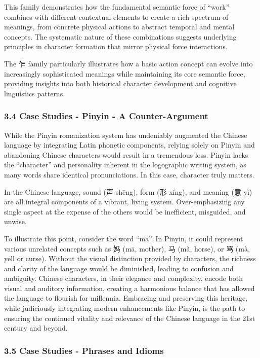 \documentclass[
  11pt,
  letterpaper,
]{article}
\begin{document}
This family demonstrates how the fundamental semantic force of ``work''
combines with different contextual elements to create a rich spectrum of
meanings, from concrete physical actions to abstract temporal and mental
concepts. The systematic nature of these combinations suggests
underlying principles in character formation that mirror physical force
interactions.

The 乍 family particularly illustrates how a basic action concept can
evolve into increasingly sophisticated meanings while maintaining its
core semantic force, providing insights into both historical character
development and cognitive linguistics patterns.

\subsubsection{3.4 Case Studies - Pinyin - A
Counter-Argument}\label{case-studies---pinyin---a-counter-argument}

While the Pinyin romanization system has undeniably augmented the
Chinese language by integrating Latin phonetic components, relying
solely on Pinyin and abandoning Chinese characters would result in a
tremendous loss. Pinyin lacks the ``character'' and personality inherent
in the logographic writing system, as many words share identical
pronunciations. In this case, character truly matters.

In the Chinese language, sound (声 shēng), form (形 xíng), and meaning
(意 yì) are all integral components of a vibrant, living system.
Over-emphasizing any single aspect at the expense of the others would be
inefficient, misguided, and unwise.

To illustrate this point, consider the word ``ma''. In Pinyin, it could
represent various unrelated concepts such as 妈 (mā, mother), 马 (mǎ,
horse), or 骂 (mà, yell or curse). Without the visual distinction
provided by characters, the richness and clarity of the language would
be diminished, leading to confusion and ambiguity. Chinese characters,
in their elegance and complexity, encode both visual and auditory
information, creating a harmonious balance that has allowed the language
to flourish for millennia. Embracing and preserving this heritage, while
judiciously integrating modern enhancements like Pinyin, is the path to
ensuring the continued vitality and relevance of the Chinese language in
the 21st century and beyond.

\subsubsection{3.5 Case Studies - Phrases and
Idioms}\label{case-studies---phrases-and-idioms}
\end{document}
